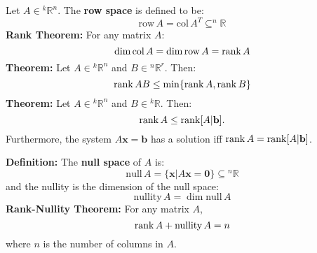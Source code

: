 \documentclass{article}
\newcommand{\bff}[1]{\mathbf{#1}}
\newcommand{\col}[1]{\mathrm{col}\,#1}
\newcommand{\row}[1]{\mathrm{row}\,#1}
\newcommand{\nullity}[1]{\mathrm{nullity}\,#1}
\newcommand{\nulll}[1]{\mathrm{null}\,#1}
\begin{document}
\begin{minipage}[t]{.45\textwidth}
        Let $A \in {^k}\mathbb{R}^n$. The \textbf{row space} is defined to be:
        \begin{equation*}
            \row A = \col A^T \subseteq ^n\mathbb{R}
        \end{equation*}
        \textbf{Rank Theorem:} For any matrix $A$:
        \begin{equation*}
            \dim \col A = \dim \row A = \rank A
        \end{equation*}
        \textbf{Theorem:} Let $A \in {^k}\mathbb{R}^n$ and $B \in {^n}\mathbb{R}^r$. Then:
        \begin{equation*}
            \rank AB \le \min\{\rank A, \rank B\}
        \end{equation*}
        \textbf{Theorem:} Let $A \in {^k}\mathbb{R}^n$ and $B \in {^k}\mathbb{R}$. Then:
        \begin{equation*}
            \rank A \le \rank [A | \bff{b}].
        \end{equation*}
        Furthermore, the system $A\bff{x}=\bff{b}$ has a solution iff $\rank A = \rank [A | \bff{b}]$.
        \vspace{2mm}

        \textbf{Definition:} The \textbf{null space} of $A$ is:
        \begin{equation*}
            \nulll A = \{\bff{x} | A\bff{x} = \bff{0}\} \subseteq {^n}\mathbb{R}
        \end{equation*}
        and the nullity is the dimension of the null space:
        \begin{equation*}
            \nullity A = \dim \nulll A
        \end{equation*}
        \textbf{Rank-Nullity Theorem:} For any matrix $A$,
        \begin{equation*}
            \rank A + \nullity A = n
        \end{equation*}
        where $n$ is the number of columns in $A$.
    \end{minipage}
\end{document}
